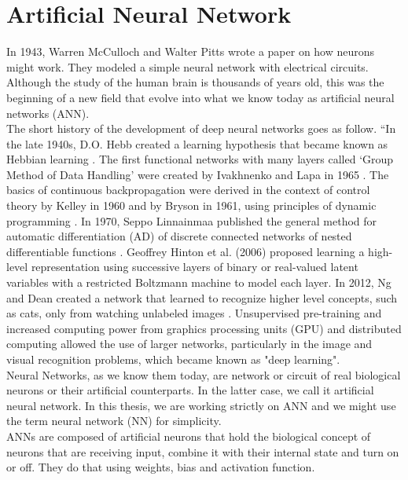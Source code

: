 \section{Artificial Neural Network}
In 1943, Warren McCulloch and Walter Pitts \cite{mcculloch1943logical} wrote a paper on how neurons might work. They modeled a simple neural network with electrical circuits. Although the study of the human brain is thousands of years old, this was the beginning of a new field that evolve into what we know today as artificial neural networks (ANN).\\
The short history of the development of deep neural networks goes as follow. ``In the late 1940s, D.O. Hebb created a learning hypothesis that became known as Hebbian learning \cite{hebb1949organization}. The first functional networks with many layers called `Group Method of Data Handling' were created by Ivakhnenko and Lapa in 1965 \cite{schmidhuber2015deep, ivakhnenko1973cybernetic, ivakhnenko1967cybernetics}. 
The basics of continuous backpropagation \cite{schmidhuber2015deep, dreyfus1990artificial, mizutani2000derivation} were derived in the context of control theory by Kelley \cite{kelley1960gradient} in 1960 and by Bryson in 1961, using principles of dynamic programming \cite{bryson1961gradient}. In 1970, Seppo Linnainmaa published the general method for automatic differentiation (AD) of discrete connected networks of nested differentiable functions \cite{linnainmaa1970representation, linnainmaa1976taylor}. Geoffrey Hinton et al. (2006) proposed learning a high-level representation using successive layers of binary or real-valued latent variables with a restricted Boltzmann machine \cite{smolensky1986information} to model each layer. In 2012, Ng and Dean created a network that learned to recognize higher level concepts, such as cats, only from watching unlabeled images \cite{le2013building}. Unsupervised pre-training and increased computing power from graphics processing units (GPU) and distributed computing allowed the use of larger networks, particularly in the image and visual recognition problems, which became known as "deep learning".\\
Neural Networks, as we know them today, are network or circuit of real biological neurons or their artificial counterparts. In the latter case, we call it artificial neural network. In this thesis, we are working strictly on ANN and we might use the term neural network (NN) for simplicity.\\ 
ANNs are composed of artificial neurons that hold the biological concept of neurons that are receiving input, combine it with their internal state and turn on or off. They do that using weights, bias and activation function.\\
